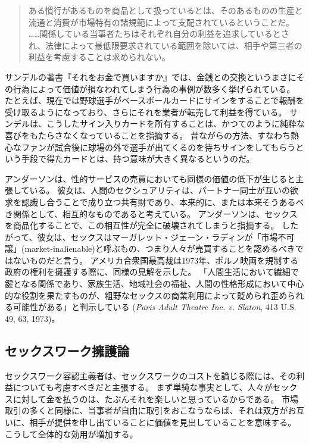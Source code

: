 \documentclass[paper=a4,book,openany]{jlreq}
\newcommand{\ig}[1]{}           %
\begin{document}
\begin{quote}

ある慣行があるものを商品として扱っているとは、そのあるものの生産と流通と消費が市場特有の諸規範によって支配されているということだ。
……関係している当事者たちはそれぞれ自分の利益を追求しているとされ、法律によって最低限要求されている範囲を除いては、相手や第三者の利益を考慮することは求められない。
\citep[pp.19--20]{anderson00:_why_commer_surrog_mother_uneth}

\end{quote}

サンデルの著書『それをお金で買いますか』\citep{sandel12:money_cant_buy}では、金銭との交換というまさにその行為によって価値が損なわれてしまう行為の事例が数多く挙げられている。
たとえば、現在では野球選手がベースボールカードにサインをすることで報酬を受け取るようになっており、さらにそれを業者が転売して利益を得ている。
サンデルは、こうしたサイン入りカードを所有することは、かつてのように純粋な喜びをもたらさなくなっていることを指摘する。
昔ながらの方法、すなわち熱心なファンが試合後に球場の外で選手が出てくるのを待ちサインをしてもらうという手段で得たカードとは、持つ意味が大きく異なるというのだ。

アンダーソン\ig{Elizabeth Anderson}は、性的サービスの売買においても同様の価値の低下が生じると主張している。
彼女は、人間のセクシュアリティは、パートナー同士が互いの欲求を認識し合うことで成り立つ共有財であり、本来的に、または本来そうあるべき関係として、相互的なものであると考えている。
アンダーソンは、セックスを商品化することで、この相互性が完全に破壊されてしまうと指摘する\citep[p.154]{anderson93:_value_ethic_econom}。
したがって、彼女は、セックスはマーガレット・ジェーン・ラディンが「市場不可譲」(market-inalienable)と呼ぶもの、つまり人々が売買することを認めるべきではないものだと言う\citep{radin87:_market_inalien,radin00:_contes_commod,satz10:_why_some_thing_shoul_not_be_sale}。
アメリカ合衆国最高裁は1973年、ポルノ映画を規制する政府の権利を擁護する際に、同様の見解を示した。
「人間生活において繊細で鍵となる関係であり、家族生活、地域社会の福祉、人間の性格形成において中心的な役割を果たすものが、粗野なセックスの商業利用によって貶められ歪められる可能性がある」と判示している
(\emph{Paris Adult Theatre Inc. v. Slaton}, 413 U.S. 49, 63, 1973)。

\subsection{セックスワーク擁護論}

セックスワーク容認主義者は、セックスワークのコストを論じる際には、その利益についても考慮すべきだと主張する。
まず単純な事実として、人々がセックスに対して金を払うのは、たぶんそれを楽しいと思っているからである。
市場取引の多くと同様に、当事者が自由に取引をおこなうならば、それは双方がお互いに、相手が提供を申し出ていることに価値を見出していることを意味する。
こうして全体的な効用が増加する。
\end{document}
